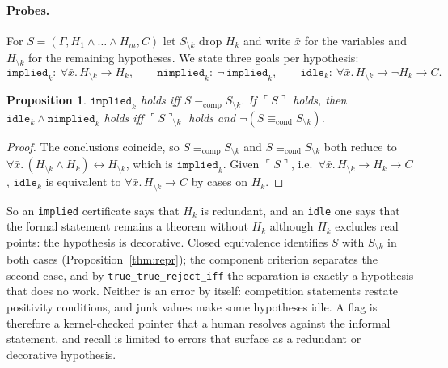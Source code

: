 \documentclass[10pt]{article}
\newtheorem{proposition}[theorem]{Proposition}
\theoremstyle{definition}
\newcommand{\Cl}[1]{\ulcorner #1 \urcorner}
\newcommand{\Econd}{\mathrel{\equiv_{\mathrm{cond}}}}
\newcommand{\Ecomp}{\mathrel{\equiv_{\mathrm{comp}}}}
\begin{document}
\paragraph{Probes.} For $S=(\Gamma,H_1\wedge\dots\wedge H_m,C)$ let $S_{\setminus k}$ drop $H_k$
and write $\bar x$ for the variables and $H_{\setminus k}$ for the remaining hypotheses. We state
three goals per hypothesis:
\[
\texttt{implied}_k:\ \forall\bar x.\,H_{\setminus k}\to H_k,\qquad
\texttt{nimplied}_k:\ \neg\,\texttt{implied}_k,\qquad
\texttt{idle}_k:\ \forall\bar x.\,H_{\setminus k}\to\neg H_k\to C.
\]
\begin{proposition}\label{prop:probe}
$\texttt{implied}_k$ holds iff $S\Ecomp S_{\setminus k}$. If $\Cl S$ holds, then
$\texttt{idle}_k\wedge\texttt{nimplied}_k$ holds iff $\Cl S_{\setminus k}$ holds and
$\neg(S\Econd S_{\setminus k})$.
\end{proposition}
\begin{proof}
The conclusions coincide, so $S\Ecomp S_{\setminus k}$ and $S\Econd S_{\setminus k}$ both reduce to
$\forall\bar x.\,(H_{\setminus k}\wedge H_k)\leftrightarrow H_{\setminus k}$, which is
$\texttt{implied}_k$. Given $\Cl S$, i.e.\ $\forall\bar x.\,H_{\setminus k}\to H_k\to C$,
$\texttt{idle}_k$ is equivalent to $\forall\bar x.\,H_{\setminus k}\to C$ by cases on $H_k$.
\end{proof}
So an \texttt{implied} certificate says that $H_k$ is redundant, and an \texttt{idle} one says
that the formal statement remains a theorem without $H_k$ although $H_k$ excludes real points:
the hypothesis is decorative. Closed equivalence identifies $S$ with $S_{\setminus k}$ in both
cases (Proposition~\ref{thm:repr}); the component criterion separates the second case, and by
\texttt{true\_true\_reject\_iff} the separation is exactly a hypothesis that does no work.
Neither is an error by itself: competition statements restate positivity conditions, and
junk values make some hypotheses idle. A flag is therefore a kernel-checked pointer that a
human resolves against the informal statement, and recall is limited to errors that surface as
a redundant or decorative hypothesis.
\end{document}
